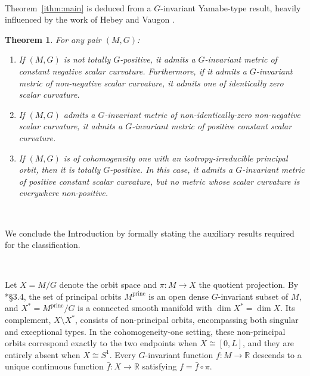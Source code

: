 \documentclass[12pt,a4paper]{amsart}
\theoremstyle{plain}
\newtheorem{theorem}{Theorem}[section]
\theoremstyle{definition}
\theoremstyle{remark}
\begin{document}
\ 

Theorem~\ref{ithm:main} is deduced from a $G$-invariant Yamabe-type result, heavily influenced by the work of Hebey and Vaugon \cites{hebey1, hebey2, hebey3}.

\begin{theorem}\label{theorem:invariantyamabe}
For any pair $(M,G)$:
\begin{enumerate}[label=\textup{(\arabic*)}, font=\upshape]
  \item If $(M,G)$ is not totally $G$-positive, it admits a $G$-invariant metric of constant negative scalar curvature. Furthermore, if it admits a $G$-invariant metric of non-negative scalar curvature, it admits one of identically zero scalar curvature.
  \item If $(M,G)$ admits a $G$-invariant metric of non-identically-zero non-negative scalar curvature, it admits a $G$-invariant metric of positive constant scalar curvature.
  \item If $(M, G)$ is of cohomogeneity one with an isotropy-irreducible principal orbit, then it is totally $G$-positive. In this case, it admits a $G$-invariant metric of positive constant scalar curvature, but no metric whose scalar curvature is everywhere non-positive.
\end{enumerate}
\end{theorem}

\ 

We conclude the Introduction by formally stating the auxiliary results required for the classification.

\ 

Let $X = M/G$ denote the orbit space and $\pi \colon M \to X$ the quotient projection. By \cite{alexandrino2015lie}*{\S 3.4}, the set of principal orbits $M^{\mathrm{princ}}$ is an open dense $G$-invariant subset of $M$, and $X^* = M^{\mathrm{princ}}/G$ is a connected smooth manifold with $\dim X^* = \dim X$. Its complement, $X \setminus X^*$, consists of non-principal orbits, encompassing both singular and exceptional types. In the cohomogeneity-one setting, these non-principal orbits correspond exactly to the two endpoints when $X \cong [0, L]$, and they are entirely absent when $X \cong S^1$. Every $G$-invariant function $f \colon M \to \mathbb{R}$ descends to a unique continuous function $\bar{f} \colon X \to \mathbb{R}$ satisfying $f = \bar{f} \circ \pi$.
\end{document}
